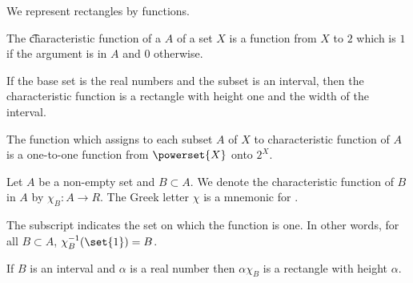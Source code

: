 

We represent rectangles by functions.


The \t{characteristic function} of a $A$ of a set $X$ is a function from $X$ to $2$ which is $1$ if the argument is in $A$ and 0 otherwise.

If the base set is the real
numbers and the subset is
an interval, then the
characteristic function
is a rectangle with height
one and the width of the interval.

The function which assigns to each subset $A$ of $X$ to characteristic function of $A$ is a one-to-one function from $\powerset{X}$ onto $2^{X}$.


Let $A$ be a non-empty
set and $B \subset A$.
We denote the characteristic
function of $B$ in $A$ by
$\chi_{B}: A \to R$.
The Greek letter $\chi$
is a mnemonic for
.

The subscript indicates
the set on which the function
is one.
In other words, for all $B \subset A$,
$\chi_{B}^{-1}(\set{1}) = B$.

If $B$ is an interval
and
$\alpha$ is a real number
then $\alpha \chi_{B}$ is
a rectangle with
height $\alpha$.

\blankpage
